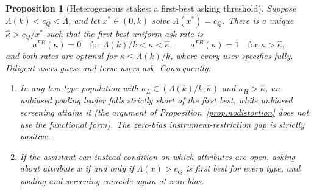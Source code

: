 \documentclass[11pt]{article}
\newtheorem{proposition}{Proposition}
\begin{document}
\begin{proposition}[Heterogeneous stakes: a first-best asking threshold]
\label{prop:hetstakes}
Suppose $\Lambda(k) < c_Q < \bar\Lambda$, and let $x^* \in (0,k)$ solve $\Lambda(x^*) = c_Q$. There is a unique $\hat\kappa > c_Q/x^*$ such that the first-best uniform ask rate is
\[
a^{FB}(\kappa) = 0 \quad \text{for } \Lambda(k)/k < \kappa < \hat\kappa, \qquad a^{FB}(\kappa) = 1 \quad \text{for } \kappa > \hat\kappa,
\]
and both rates are optimal for $\kappa \le \Lambda(k)/k$, where every user specifies fully. Diligent users guess and terse users ask. Consequently:
\begin{enumerate}[label=(\roman*)]
\item In any two-type population with $\kappa_L \in (\Lambda(k)/k, \hat\kappa)$ and $\kappa_H > \hat\kappa$, an unbiased pooling leader falls strictly short of the first best, while unbiased screening attains it (the argument of Proposition~\ref{prop:nodistortion} does not use the functional form). The zero-bias instrument-restriction gap is strictly positive.
\item If the assistant can instead condition on which attributes are open, asking about attribute $x$ if and only if $\Lambda(x) > c_Q$ is first best for every type, and pooling and screening coincide again at zero bias.
\end{enumerate}
\end{proposition}
\end{document}
